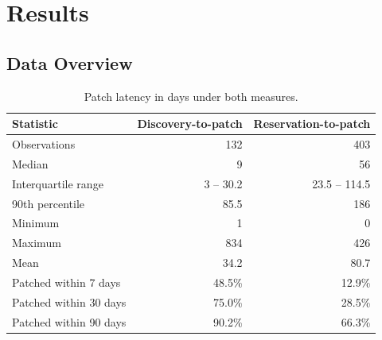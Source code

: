 \chapter{Results}
\label{ch:results}


\section{Data Overview}

\begin{table}[h]
    \centering
    \caption{Patch latency in days under both measures.}
    \label{tab:descriptives}
    \begin{tabular}{lrr}
        \toprule
        Statistic & Discovery-to-patch & Reservation-to-patch \\
        \midrule
        Observations             & 132 & 403 \\
        Median                   & 9 & 56 \\
        Interquartile range      & 3 -- 30.2 & 23.5 -- 114.5 \\
        90th percentile          & 85.5 & 186 \\
        Minimum                  & 1 & 0 \\
        Maximum                  & 834 & 426 \\
        Mean                     & 34.2 & 80.7 \\
        Patched within 7 days    & 48.5\% & 12.9\% \\
        Patched within 30 days   & 75.0\% & 28.5\% \\
        Patched within 90 days   & 90.2\% & 66.3\% \\
        \bottomrule
    \end{tabular}
\end{table}

